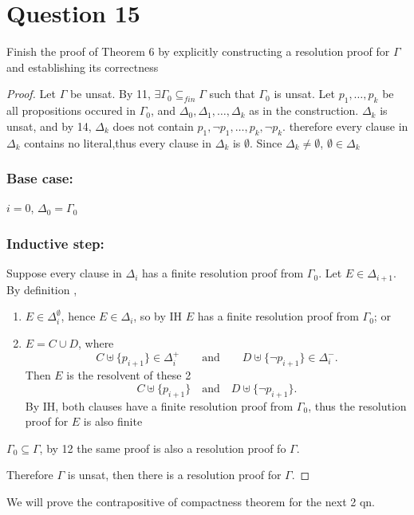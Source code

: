 \documentclass{article}
\begin{document}
\section*{Question 15}
Finish the proof of Theorem 6 by explicitly constructing a resolution proof for $\Gamma$ and establishing its correctness
\begin{proof}
Let $\Gamma$ be unsat. By 11, $\exists 
\Gamma_0 \subseteq_{{fin}} \Gamma
$
such that $\Gamma_0$ is unsat. Let $p_1,\dots,p_k$ be all propositions occured in $\Gamma_0$, and
$
\Delta_0,\Delta_1,\dots,\Delta_k
$
as in the construction. $\Delta_k$ is unsat, and by 14, $\Delta_k$ does not contain 
$
p_1,\neg p_1,\dots,p_k,\neg p_k.
$
therefore every clause in $\Delta_k$ contains no literal,thus every clause in $\Delta_k$ is $\emptyset$. Since $\Delta_k \neq \emptyset$,
$
\emptyset \in \Delta_k
$

\subsubsection*{Base case:}
$i=0$, $\Delta_0=\Gamma_0$
\subsubsection*{Inductive step:}
Suppose every clause in $\Delta_i$ has a finite resolution proof from $\Gamma_0$. Let $E \in \Delta_{i+1}$. By definition ,

\begin{enumerate}
    \item $E \in \Delta_i^{\emptyset}$, hence $E \in \Delta_i$, so by IH $E$ has a finite resolution proof from $\Gamma_0$; or
    \item $E = C \cup D$, where
    \[
    C \uplus \{p_{i+1}\} \in \Delta_i^{+}
    \qquad\text{and}\qquad
    D \uplus \{\neg p_{i+1}\} \in \Delta_i^{-}.
    \]
    Then $E$ is the resolvent of these 2
    \[
    C \uplus \{p_{i+1}\}
    \quad\text{and}\quad
    D \uplus \{\neg p_{i+1}\}.
    \]
    By IH, both clauses have a finite resolution proof from $\Gamma_0$, thus the resolution proof for $E$ is also finite
\end{enumerate}

$\Gamma_0 \subseteq \Gamma$, by 12 the same proof is also a resolution proof fo $\Gamma$.

Therefore $\Gamma$ is unsat, then there is a resolution proof for $\Gamma$.
\end{proof}
We will prove the contrapositive of compactness theorem for the next 2 qn.
\end{document}
